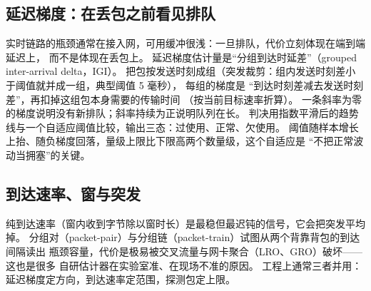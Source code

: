 \documentclass[12pt,a4paper,fontset=fandol]{ctexbook}
\begin{document}
\subsection*{延迟梯度：在丢包之前看见排队}
实时链路的瓶颈通常在接入网，可用缓冲很浅：一旦排队，代价立刻体现在端到端延迟上，
而不是体现在丢包上。
延迟梯度估计量是``分组到达时延差''（grouped inter-arrival delta，IGI）。
把包按发送时刻成组（突发裁剪：组内发送时刻差小于阈值就并成一组，典型阈值 5 毫秒），
每组的梯度是 ``到达时刻差减去发送时刻差''，再扣掉这组包本身需要的传输时间
（按当前目标速率折算）。
一条斜率为零的梯度说明没有新排队；斜率持续为正说明队列在长。
判决用指数平滑后的趋势线与一个自适应阈值比较，输出三态：过使用、正常、欠使用。
阈值随样本增长上抬、随负梯度回落，量级上限比下限高两个数量级，这个自适应是
``不把正常波动当拥塞''的关键。

\subsection*{到达速率、窗与突发}
纯到达速率（窗内收到字节除以窗时长）是最稳但最迟钝的信号，它会把突发平均掉。
分组对（packet-pair）与分组链（packet-train）试图从两个背靠背包的到达间隔读出
瓶颈容量，代价是极易被交叉流量与网卡聚合（LRO、GRO）破坏——这也是很多
自研估计器在实验室准、在现场不准的原因。
工程上通常三者并用：延迟梯度定方向，到达速率定范围，探测包定上限。
\end{document}
